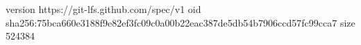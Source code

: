 version https://git-lfs.github.com/spec/v1
oid sha256:75bca660e3188f9e82ef3fc09c0a00b22eac387de5db54b7906ccd57fc99cca7
size 524384
